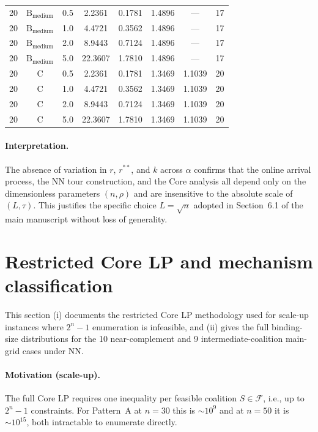\documentclass[11pt]{article}
\theoremstyle{plain}
\theoremstyle{definition}
\theoremstyle{remark}
\begin{document}
\begin{table}[htbp]
\begin{tabular}{@{}cccccccc@{}}
\midrule
20 & $\text{B}_{\text{medium}}$ & 0.5 & 2.2361 & 0.1781 & 1.4896 & --- & 17 \\
20 & $\text{B}_{\text{medium}}$ & 1.0 & 4.4721 & 0.3562 & 1.4896 & --- & 17 \\
20 & $\text{B}_{\text{medium}}$ & 2.0 & 8.9443 & 0.7124 & 1.4896 & --- & 17 \\
20 & $\text{B}_{\text{medium}}$ & 5.0 & 22.3607 & 1.7810 & 1.4896 & --- & 17 \\
\midrule
20 & C & 0.5 & 2.2361 & 0.1781 & 1.3469 & 1.1039 & 20 \\
20 & C & 1.0 & 4.4721 & 0.3562 & 1.3469 & 1.1039 & 20 \\
20 & C & 2.0 & 8.9443 & 0.7124 & 1.3469 & 1.1039 & 20 \\
20 & C & 5.0 & 22.3607 & 1.7810 & 1.3469 & 1.1039 & 20 \\
\bottomrule
\end{tabular}
\end{table}

\paragraph{Interpretation.} The absence of variation in $r$, $r^{\ast\ast}$, and $k$ across $\alpha$ confirms that the online arrival process, the NN tour construction, and the Core analysis all depend only on the dimensionless parameters $(n,\rho)$ and are insensitive to the absolute scale of $(L,\tau)$. This justifies the specific choice $L=\sqrt{n}$ adopted in Section~6.1 of the main manuscript without loss of generality.

\section{Restricted Core LP and mechanism classification}
\label{app:restricted-lp}

This section (i) documents the restricted Core LP methodology used for scale-up instances where $2^n-1$ enumeration is infeasible, and (ii) gives the full binding-size distributions for the 10 near-complement and 9 intermediate-coalition main-grid cases under NN.

\paragraph{Motivation (scale-up).} The full Core LP requires one inequality per feasible coalition $S\in\mathcal{F}$, i.e., up to $2^n-1$ constraints. For Pattern~A at $n=30$ this is $\sim 10^9$ and at $n=50$ it is $\sim 10^{15}$, both intractable to enumerate directly.
\end{document}
